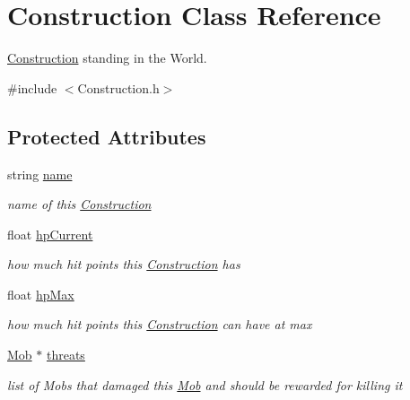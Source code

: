 \hypertarget{class_construction}{}\section{Construction Class Reference}
\label{class_construction}


\hyperlink{class_construction}{Construction} standing in the World.  




{\ttfamily \#include $<$Construction.\+h$>$}

\subsection*{Protected Attributes}
\begin{DoxyCompactItemize}
\item 
string \hyperlink{class_construction_a1c41965939bcc09f9c55a6bb8f15b82e}{name}\hypertarget{class_construction_a1c41965939bcc09f9c55a6bb8f15b82e}{}\label{class_construction_a1c41965939bcc09f9c55a6bb8f15b82e}

\begin{DoxyCompactList}\small\item\em name of this \hyperlink{class_construction}{Construction} \end{DoxyCompactList}\item 
float \hyperlink{class_construction_a9c4cd0e1175cc00691bda4797317f240}{hp\+Current}\hypertarget{class_construction_a9c4cd0e1175cc00691bda4797317f240}{}\label{class_construction_a9c4cd0e1175cc00691bda4797317f240}

\begin{DoxyCompactList}\small\item\em how much hit points this \hyperlink{class_construction}{Construction} has \end{DoxyCompactList}\item 
float \hyperlink{class_construction_a86e513fbc8ff981eba3331438b9e3d65}{hp\+Max}\hypertarget{class_construction_a86e513fbc8ff981eba3331438b9e3d65}{}\label{class_construction_a86e513fbc8ff981eba3331438b9e3d65}

\begin{DoxyCompactList}\small\item\em how much hit points this \hyperlink{class_construction}{Construction} can have at max \end{DoxyCompactList}\item 
\hyperlink{class_mob}{Mob} $\ast$ \hyperlink{class_construction_ab55201e2b08ad7a87285e047d9530dee}{threats}\hypertarget{class_construction_ab55201e2b08ad7a87285e047d9530dee}{}\label{class_construction_ab55201e2b08ad7a87285e047d9530dee}

\begin{DoxyCompactList}\small\item\em list of Mobs that damaged this \hyperlink{class_mob}{Mob} and should be rewarded for killing it \end{DoxyCompactList}\end{DoxyCompactItemize}


